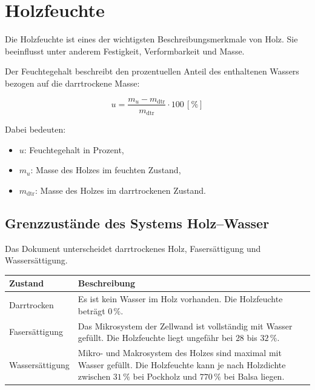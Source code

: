 \documentclass[
  12pt,
  a4paper,
  oneside
]{scrreprt}
\begin{document}
\section{Holzfeuchte}

Die Holzfeuchte ist eines der wichtigsten Beschreibungsmerkmale von
Holz. Sie beeinflusst unter anderem Festigkeit, Verformbarkeit und
Masse. 

Der Feuchtegehalt beschreibt den prozentuellen Anteil des enthaltenen
Wassers bezogen auf die darrtrockene Masse:

\begin{equation}
  u =
  \frac{m_u - m_{\mathrm{dtr}}}
  {m_{\mathrm{dtr}}}
  \cdot 100
  \,[\%]
\end{equation}

Dabei bedeuten:

\begin{itemize}
  \item $u$: Feuchtegehalt in Prozent,
  \item $m_u$: Masse des Holzes im feuchten Zustand,
  \item $m_{\mathrm{dtr}}$: Masse des Holzes im darrtrockenen Zustand.
\end{itemize}



\subsection{Grenzzustände des Systems Holz--Wasser}

Das Dokument unterscheidet darrtrockenes Holz, Fasersättigung und
Wassersättigung.

\begin{longtable}{
  >{\raggedright\arraybackslash}p{}
  >{\raggedright\arraybackslash}p{}
}
\toprule
\textbf{Zustand} &
\textbf{Beschreibung} \\
\midrule
\endhead

Darrtrocken &
Es ist kein Wasser im Holz vorhanden. Die Holzfeuchte beträgt
$0\,\%$. \\

Fasersättigung &
Das Mikrosystem der Zellwand ist vollständig mit Wasser gefüllt. Die
Holzfeuchte liegt ungefähr bei $28$ bis $32\,\%$. \\

Wassersättigung &
Mikro- und Makrosystem des Holzes sind maximal mit Wasser gefüllt. Die
Holzfeuchte kann je nach Holzdichte zwischen $31\,\%$ bei Pockholz und
$770\,\%$ bei Balsa liegen. \\

\bottomrule
\end{longtable}
\end{document}
